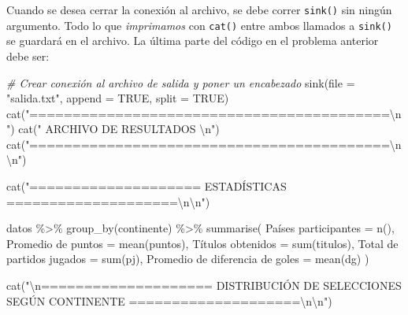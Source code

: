 \documentclass[
]{book}
\newenvironment{Shaded}{\begin{snugshade}}{\end{snugshade}}
\newcommand{\AttributeTok}[1]{\textcolor[rgb]{0.77,0.63,0.00}{#1}}
\newcommand{\CommentTok}[1]{\textcolor[rgb]{0.56,0.35,0.01}{\textit{#1}}}
\newcommand{\ConstantTok}[1]{\textcolor[rgb]{0.00,0.00,0.00}{#1}}
\newcommand{\FunctionTok}[1]{\textcolor[rgb]{0.00,0.00,0.00}{#1}}
\newcommand{\NormalTok}[1]{#1}
\newcommand{\OtherTok}[1]{\textcolor[rgb]{0.56,0.35,0.01}{#1}}
\newcommand{\SpecialCharTok}[1]{\textcolor[rgb]{0.00,0.00,0.00}{#1}}
\newcommand{\StringTok}[1]{\textcolor[rgb]{0.31,0.60,0.02}{#1}}
\begin{document}
Cuando se desea cerrar la conexión al archivo, se debe correr \texttt{sink()} sin ningún argumento. Todo lo que \emph{imprimamos} con \texttt{cat()} entre ambos llamados a \texttt{sink()} se guardará en el archivo. La última parte del código en el problema anterior debe ser:

\begin{Shaded}
\begin{Highlighting}[]
\CommentTok{\# Crear conexión al archivo de salida y poner un encabezado}
\FunctionTok{sink}\NormalTok{(}\AttributeTok{file =} \StringTok{"salida.txt"}\NormalTok{, }\AttributeTok{append =} \ConstantTok{TRUE}\NormalTok{, }\AttributeTok{split =} \ConstantTok{TRUE}\NormalTok{)}
\FunctionTok{cat}\NormalTok{(}\StringTok{"==========================================}\SpecialCharTok{\textbackslash{}n}\StringTok{"}\NormalTok{)}
\FunctionTok{cat}\NormalTok{(}\StringTok{"            ARCHIVO DE RESULTADOS         }\SpecialCharTok{\textbackslash{}n}\StringTok{"}\NormalTok{)}
\FunctionTok{cat}\NormalTok{(}\StringTok{"==========================================}\SpecialCharTok{\textbackslash{}n\textbackslash{}n}\StringTok{"}\NormalTok{)}

\FunctionTok{cat}\NormalTok{(}\StringTok{"==================== ESTADÍSTICAS ====================}\SpecialCharTok{\textbackslash{}n\textbackslash{}n}\StringTok{"}\NormalTok{)}

\NormalTok{datos }\SpecialCharTok{\%\textgreater{}\%} 
    \FunctionTok{group\_by}\NormalTok{(continente) }\SpecialCharTok{\%\textgreater{}\%} 
    \FunctionTok{summarise}\NormalTok{(}
        \StringTok{\textasciigrave{}}\AttributeTok{Países participantes}\StringTok{\textasciigrave{}} \OtherTok{=} \FunctionTok{n}\NormalTok{(),}
        \StringTok{\textasciigrave{}}\AttributeTok{Promedio de puntos}\StringTok{\textasciigrave{}} \OtherTok{=} \FunctionTok{mean}\NormalTok{(puntos),}
        \StringTok{\textasciigrave{}}\AttributeTok{Títulos obtenidos}\StringTok{\textasciigrave{}} \OtherTok{=} \FunctionTok{sum}\NormalTok{(titulos),}
        \StringTok{\textasciigrave{}}\AttributeTok{Total de partidos jugados}\StringTok{\textasciigrave{}} \OtherTok{=} \FunctionTok{sum}\NormalTok{(pj),}
        \StringTok{\textasciigrave{}}\AttributeTok{Promedio de diferencia de goles}\StringTok{\textasciigrave{}} \OtherTok{=} \FunctionTok{mean}\NormalTok{(dg)}
\NormalTok{    )}

\FunctionTok{cat}\NormalTok{(}\StringTok{"}\SpecialCharTok{\textbackslash{}n}\StringTok{==================== DISTRIBUCIÓN DE SELECCIONES SEGÚN CONTINENTE ====================}\SpecialCharTok{\textbackslash{}n\textbackslash{}n}\StringTok{"}\NormalTok{)}


\end{Highlighting}
\end{Shaded}
\end{document}
